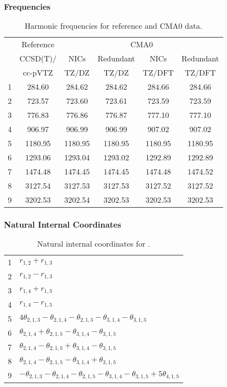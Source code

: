 \documentclass[10pt,oneside]{article}
\begin{document}
\begin{table}[h!]
\subsubsection*{Frequencies}
\centering
\caption{Harmonic frequencies for reference and CMA0 data.}
\begin{tabular}{cccccc}
\toprule
{} & Reference & \multicolumn{4}{c}{CMA0} \\
{} &  CCSD(T)/ &    NICs &  Redundant &    NICs & Redundant \\
{} &   cc-pVTZ &   TZ/DZ &      TZ/DZ &  TZ/DFT &    TZ/DFT \\
\midrule
1 &    284.60 &  284.62 &     284.62 &  284.66 &    284.66 \\
2 &    723.57 &  723.60 &     723.61 &  723.59 &    723.59 \\
3 &    776.83 &  776.86 &     776.87 &  777.10 &    777.10 \\
4 &    906.97 &  906.99 &     906.99 &  907.02 &    907.02 \\
5 &   1180.95 & 1180.95 &    1180.95 & 1180.95 &   1180.95 \\
6 &   1293.06 & 1293.04 &    1293.02 & 1292.89 &   1292.89 \\
7 &   1474.48 & 1474.45 &    1474.45 & 1474.48 &   1474.52 \\
8 &   3127.54 & 3127.53 &    3127.53 & 3127.52 &   3127.52 \\
9 &   3202.53 & 3202.54 &    3202.53 & 3202.53 &   3202.53 \\
\bottomrule
\end{tabular}
\end{table}

\begin{table}[h!]
\subsubsection*{Natural Internal Coordinates}
\centering
\caption{Natural internal coordinates for .}
\small
\begin{tabular}{ll}
\toprule
  1   & $r_{1,2} + r_{1,3}$ \\
  2   & $r_{1,2} - r_{1,3}$ \\
  3   & $r_{1,4} + r_{1,5}$ \\
  4   & $r_{1,4} - r_{1,5}$ \\
  5   & $4\theta_{2,1,3} - \theta_{2,1,4} - \theta_{2,1,5} - \theta_{3,1,4} - \theta_{3,1,5}$ \\
  6   & $\theta_{2,1,4} + \theta_{2,1,5} - \theta_{3,1,4} - \theta_{3,1,5}$ \\
  7   & $\theta_{2,1,4} - \theta_{2,1,5} + \theta_{3,1,4} - \theta_{3,1,5}$ \\
  8   & $\theta_{2,1,4} - \theta_{2,1,5} - \theta_{3,1,4} + \theta_{3,1,5}$ \\
  9   & $-\theta_{2,1,3} - \theta_{2,1,4} - \theta_{2,1,5} - \theta_{3,1,4} - \theta_{3,1,5} + 5\theta_{4,1,5}$ \\
\bottomrule
\end{tabular}
\end{table}
\end{document}
